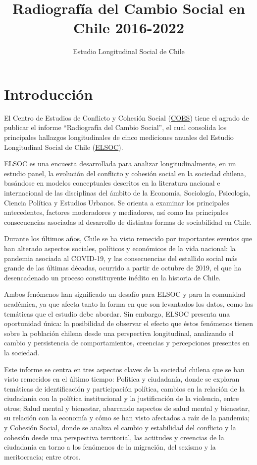 \documentclass[
  12pt,
]{book}
\title{Radiografía del Cambio Social en Chile 2016-2022}
\subtitle{Estudio Longitudinal Social de Chile}
\author{}
\date{\vspace{-2.5em}}
\begin{document}
\maketitle

{
\hypersetup{linkcolor=}
\setcounter{tocdepth}{1}
\tableofcontents
}
\listoffigures
\listoftables
{}
\hypertarget{introducciuxf3n}{%
\chapter*{Introducción}\label{introducciuxf3n}}

El Centro de Estudios de Conflicto y Cohesión Social (\href{https://coes.cl/}{COES}) tiene el agrado de publicar el informe ``Radiografía del Cambio Social'', el cual consolida los principales hallazgos longitudinales de cinco mediciones anuales del Estudio Longitudinal Social de Chile (\href{https://coes.cl/encuesta-panel/}{ELSOC}).

ELSOC es una encuesta desarrollada para analizar longitudinalmente, en un estudio panel, la evolución del conflicto y cohesión social en la sociedad chilena, basándose en modelos conceptuales descritos en la literatura nacional e internacional de las disciplinas del ámbito de la Economía, Sociología, Psicología, Ciencia Política y Estudios Urbanos. Se orienta a examinar los principales antecedentes, factores moderadores y mediadores, así como las principales consecuencias asociadas al desarrollo de distintas formas de sociabilidad en Chile.

Durante los últimos años, Chile se ha visto remecido por importantes eventos que han alterado aspectos sociales, políticos y económicos de la vida nacional: la pandemia asociada al COVID-19, y las consecuencias del estallido social más grande de las últimas décadas, ocurrido a partir de octubre de 2019, el que ha desencadenado un proceso constituyente inédito en la historia de Chile.

Ambos fenómenos han significado un desafío para ELSOC y para la comunidad académica, ya que afecta tanto la forma en que son levantados los datos, como las temáticas que el estudio debe abordar. Sin embargo, ELSOC presenta una oportunidad única: la posibilidad de observar el efecto que éstos fenómenos tienen sobre la población chilena desde una perspectiva longitudinal, analizando el cambio y persistencia de comportamientos, creencias y percepciones presentes en la sociedad.

Este informe se centra en tres aspectos claves de la sociedad chilena que se han visto remecidos en el último tiempo: Política y ciudadanía, donde se exploran temáticas de identificación y participación política, cambios en la relación de la ciudadanía con la política institucional y la justificación de la violencia, entre otros; Salud mental y bienestar, abarcando aspectos de salud mental y bienestar, su relación con la economía y cómo se han visto afectados a raíz de la pandemia; y Cohesión Social, donde se analiza el cambio y estabilidad del conflicto y la cohesión desde una perspectiva territorial, las actitudes y creencias de la ciudadanía en torno a los fenómenos de la migración, del sexismo y la meritocracia; entre otros.
\end{document}
